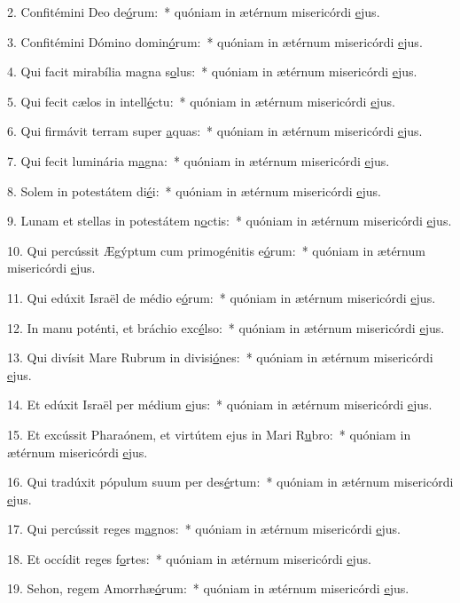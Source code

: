 2. Confitémini Deo de\uline{ó}rum:~* quóniam in ætérnum misericórdi \uline{e}jus.\par 
3. Confitémini Dómino domin\uline{ó}rum:~* quóniam in ætérnum misericórdi \uline{e}jus.\par 
4. Qui facit mirabília magna s\uline{o}lus:~* quóniam in ætérnum misericórdi \uline{e}jus.\par 
5. Qui fecit cælos in intell\uline{é}ctu:~* quóniam in ætérnum misericórdi \uline{e}jus.\par 
6. Qui firmávit terram super \uline{a}quas:~* quóniam in ætérnum misericórdi \uline{e}jus.\par 
7. Qui fecit luminária m\uline{a}gna:~* quóniam in ætérnum misericórdi \uline{e}jus.\par 
8. Solem in potestátem di\uline{é}i:~* quóniam in ætérnum misericórdi \uline{e}jus.\par 
9. Lunam et stellas in potestátem n\uline{o}ctis:~* quóniam in ætérnum misericórdi \uline{e}jus.\par 
10. Qui percússit Ægýptum cum primogénitis e\uline{ó}rum:~* quóniam in ætérnum misericórdi \uline{e}jus.\par 
11. Qui edúxit Israël de médio e\uline{ó}rum:~* quóniam in ætérnum misericórdi \uline{e}jus.\par 
12. In manu poténti, et bráchio exc\uline{é}lso:~* quóniam in ætérnum misericórdi \uline{e}jus.\par 
13. Qui divísit Mare Rubrum in divisi\uline{ó}nes:~* quóniam in ætérnum misericórdi \uline{e}jus.\par 
14. Et edúxit Israël per médium \uline{e}jus:~* quóniam in ætérnum misericórdi \uline{e}jus.\par 
15. Et excússit Pharaónem, et virtútem ejus in Mari R\uline{u}bro:~* quóniam in ætérnum misericórdi \uline{e}jus.\par 
16. Qui tradúxit pópulum suum per des\uline{é}rtum:~* quóniam in ætérnum misericórdi \uline{e}jus.\par 
17. Qui percússit reges m\uline{a}gnos:~* quóniam in ætérnum misericórdi \uline{e}jus.\par 
18. Et occídit reges f\uline{o}rtes:~* quóniam in ætérnum misericórdi \uline{e}jus.\par 
19. Sehon, regem Amorrhæ\uline{ó}rum:~* quóniam in ætérnum misericórdi \uline{e}jus.\par 
